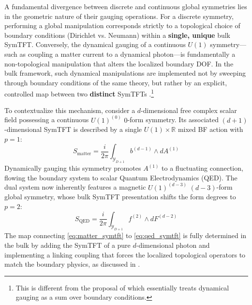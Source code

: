 \documentclass[aps,preprint,nofootinbib,preprintnumbers,eqsecnum,superscriptaddress]{revtex4}
\numberwithin{equation}{section}
\begin{document}
A fundamental divergence between discrete and continuous global symmetries lies in the geometric nature of their gauging operations. For a discrete symmetry, performing a global manipulation corresponds strictly to a topological choice of boundary conditions (Dirichlet vs. Neumann) within a \textbf{single, unique} bulk SymTFT. Conversely, the dynamical gauging of a continuous $U(1)$ symmetry—such as coupling a matter current to a dynamical photon—is fundamentally a non-topological manipulation that alters the localized boundary DOF. In the bulk framework, such dynamical manipulations are implemented not by sweeping through boundary conditions of the same theory, but rather by an explicit, controlled map between two \textbf{distinct} SymTFTs \cite{Antinucci_2025, Antinucci:2024bny}.\footnote{This is different from the proposal of \cite{brennan2024symtftcontinuoussymmetries} which essentially treats dynamical gauging as a sum over boundary conditions.}

To contextualize this mechanism, consider a $d$-dimensional free complex scalar field possessing a continuous $U(1)^{(0)}$ $0$-form symmetry. Its associated $(d+1)$-dimensional SymTFT is described by a single $U(1) \times \mathbb{R}$ mixed BF action with $p=1$:
\begin{equation}\label{eq:matter_symtft}
    S_{\text{matter}} = \frac{i}{2\pi} \int_{\mathcal{Y}_{D+1}} b^{(d-1)} \wedge dA^{(1)}
\end{equation}
Dynamically gauging this symmetry promotes $A^{(1)}$ to a fluctuating connection, flowing the boundary system to scalar Quantum Electrodynamics (QED). The dual system now inherently features a magnetic $U(1)^{(d-3)}$ $(d-3)$-form global symmetry, whose bulk SymTFT presentation shifts the form degrees to $p=2$:
\begin{equation}\label{eq:qed_symtft}
    S_{\text{QED}} = \frac{i}{2\pi} \int_{\mathcal{Y}_{D+1}} f^{(2)} \wedge dF^{(d-2)}
\end{equation}
The map connecting \eqref{eq:matter_symtft} to \eqref{eq:qed_symtft} is fully determined in the bulk by adding the SymTFT of a pure $d$-dimensional photon and implementing a linking coupling that forces the localized topological operators to match the boundary physics, as discussed in \cite{Antinucci_2025, Antinucci:2024bny}. 
\end{document}
